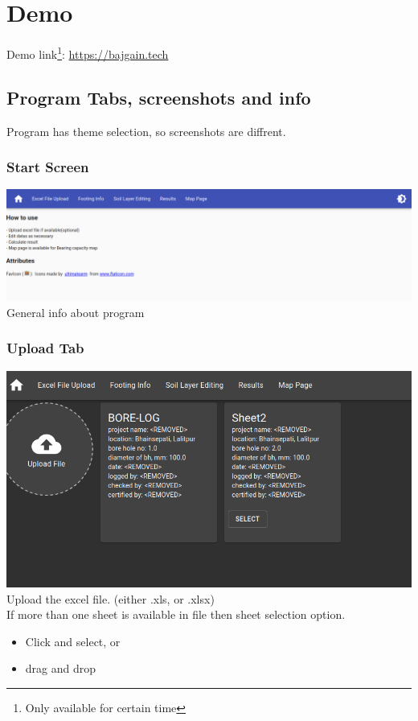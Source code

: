 \chapter{Demo}
Demo link\footnote{Only available for certain time}: \url{https://bajgain.tech}\\

\section{Program Tabs, screenshots and info}
Program has theme selection, so screenshots are diffrent.\\
\subsection{Start Screen}
\includegraphics[width=\linewidth,keepaspectratio]{./extras/images/index.png}
General info about program\\

\subsection{Upload Tab}
\includegraphics[width=\linewidth,keepaspectratio]{./extras/images/fileInfo.png}
Upload the excel file. (either .xls, or .xlsx)\\
If more than one sheet is available in file then sheet selection option.\\
\begin{itemize}
\item Click and select, or\\
\item drag and drop\\
\end{itemize}

